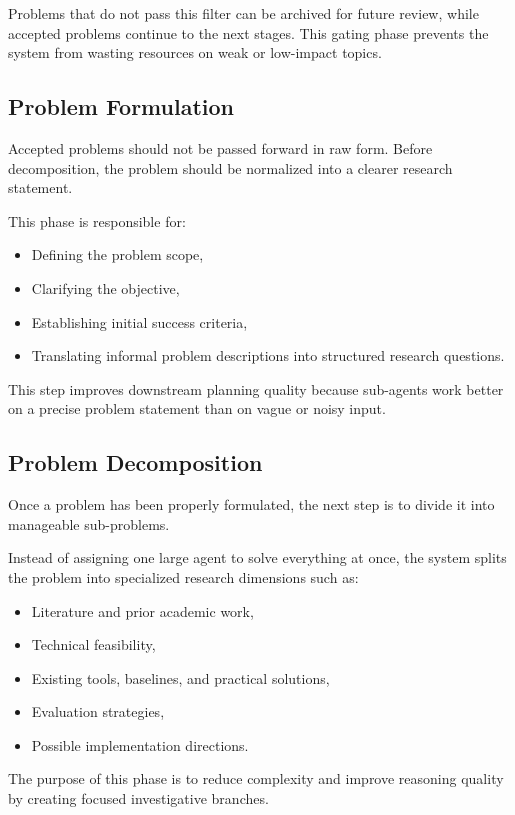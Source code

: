 \documentclass[11pt,a4paper]{article}
\begin{document}
Problems that do not pass this filter can be archived for future review, while accepted problems continue to the next stages. This gating phase prevents the system from wasting resources on weak or low-impact topics.

\subsection{Problem Formulation}

Accepted problems should not be passed forward in raw form. Before decomposition, the problem should be normalized into a clearer research statement.

This phase is responsible for:
\begin{itemize}
    \item Defining the problem scope,
    \item Clarifying the objective,
    \item Establishing initial success criteria,
    \item Translating informal problem descriptions into structured research questions.
\end{itemize}

This step improves downstream planning quality because sub-agents work better on a precise problem statement than on vague or noisy input.

\subsection{Problem Decomposition}

Once a problem has been properly formulated, the next step is to divide it into manageable sub-problems.

Instead of assigning one large agent to solve everything at once, the system splits the problem into specialized research dimensions such as:
\begin{itemize}
    \item Literature and prior academic work,
    \item Technical feasibility,
    \item Existing tools, baselines, and practical solutions,
    \item Evaluation strategies,
    \item Possible implementation directions.
\end{itemize}

The purpose of this phase is to reduce complexity and improve reasoning quality by creating focused investigative branches.
\end{document}
